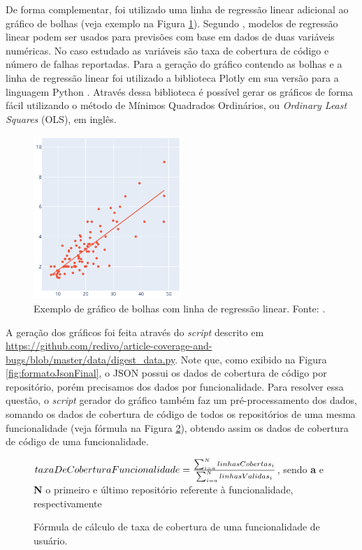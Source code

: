 \documentclass[11.5pt]{article}
\begin{document}
De forma complementar, foi utilizado uma linha de regressão linear adicional ao gráfico de bolhas
(veja exemplo na Figura \ref{fig:lin_reg_example}).
Segundo \cite{openIntroStat}, modelos de regressão linear podem ser usados para previsões com base
em dados de duas variáveis numéricas.
No caso estudado as variáveis são taxa de cobertura de código e número de falhas reportadas.
Para a geração do gráfico contendo as bolhas e a linha de regressão linear foi utilizado a
biblioteca Plotly em sua versão para a linguagem Python \cite{plotly}.
Através dessa biblioteca é possível gerar os gráficos de forma fácil utilizando o método de Mínimos
Quadrados Ordinários, ou \textit{Ordinary Least Squares} (OLS), em inglês.

\begin{figure}[ht]
    \centering
    \includegraphics[width=0.5\textwidth]{linear_regression_example.png}
    \caption{Exemplo de gráfico de bolhas com linha de regressão linear. Fonte: \cite{plotly}.}
    \label{fig:lin_reg_example}
\end{figure}

A geração dos gráficos foi feita através do \textit{script} descrito em
\url{https://github.com/redivo/article-coverage-and-bugs/blob/master/data/digest_data.py}.
Note que, como exibido na Figura \ref{fig:formatoJsonFinal}, o JSON possui os dados de cobertura de
código por repositório, porém precisamos dos dados por funcionalidade.
Para resolver essa questão, o \textit{script} gerador do gráfico também faz um pré-processamento
dos dados, somando os dados de cobertura de código de todos os repositórios de uma mesma
funcionalidade (veja fórmula na Figura \ref{fig:formulaTaxaDeCoberturaComponent}), obtendo assim os
dados de cobertura de código de uma funcionalidade.

\begin{figure}[ht]
\caption{Fórmula de cálculo de taxa de cobertura de uma funcionalidade de usuário.}
\label{fig:formulaTaxaDeCoberturaComponent}
\begin{center}
    $taxaDeCoberturaFuncionalidade = {\sum_{i=a}^{N} linhasCobertas_i \over \sum_{i=a}^{N} linhasValidas_i}$, sendo
    \textbf{a} e \textbf{N} o primeiro e último repositório referente à funcionalidade, respectivamente
\end{center}
\end{figure}
\end{document}
